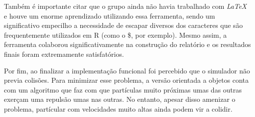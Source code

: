\documentclass[rel_mlp]{iiufrgs}
\begin{document}
Também é importante citar que o grupo ainda não havia trabalhado com \textit{LaTeX} e
houve um enorme aprendizado utilizando essa ferramenta, sendo um significativo empecilho a necessidade de
escapar diversos dos caracteres que são frequentemente utilizados em R (como o {\$}, por exemplo). Mesmo
assim, a ferramenta colaborou significativamente na construção do relatório e os resultados finais foram
extremamente satisfatórios.

Por fim, ao finalizar a implementação funcional foi percebido que o simulador não previa colisões.
Para minimizar esse problema, a versão orientada a objetos conta com um algoritmo que faz com que
partículas muito próximas umas das outras exerçam uma repulsão umas nas outras. No entanto, apesar disso
amenizar o problema, partícular com velocidades muito altas ainda podem vir a colidir.


%



\end{document}
